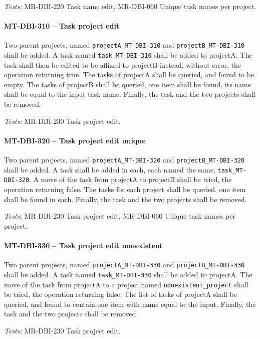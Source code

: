 \textit{Tests: } MR-DBI-220 Task name edit, MR-DBI-060 Unique task names per
project.

\paragraph{MT-DBI-310 -- Task project edit}
Two parent projects, named \lstinline{projectA_MT-DBI-310} and
\lstinline{projectB_MT-DBI-310} shall be added.
A task named \lstinline{task_MT-DBI-310} shall be added to projectA.
The task shall then be edited to be affixed to projectB instead,
without error, the operation returning true.
The tasks of projectA shall be queried, and found to be empty.
The tasks of projectB shall be queried, one item shall be found,
its name shall be equal to the input task name.
Finally, the task and the two projects shall be removed.

\textit{Tests: } MR-DBI-230 Task project edit.

\paragraph{MT-DBI-320 -- Task project edit unique}
Two parent projects, named \lstinline{projectA_MT-DBI-320} and
\lstinline{projectB_MT-DBI-320} shall be added.
A task shall be added in each, each named the same, \lstinline{task_MT-DBI-320}.
A move of the task from projectA to projectB shall be tried, the operation
returning false.
The tasks for each project shall be queried, one item shall be found in each.
Finally, the task and the two projects shall be removed.

\textit{Tests: } MR-DBI-230 Task project edit, MR-DBI-060 Unique task names
per project.

\paragraph{MT-DBI-330 -- Task project edit nonexistent}
Two parent projects, named \lstinline{projectA_MT-DBI-330} and
\lstinline{projectB_MT-DBI-330} shall be added.
A task named \lstinline{task_MT-DBI-330} shall be added to projectA.
The move of the task from projectA to a project named
\lstinline{nonexistent_project} shall be tried, the operation returning false.
The list of tasks of projectA shall be queried, and found to contain
one item with name equal to the input.
Finally, the task and the two projects shall be removed.

\textit{Tests: } MR-DBI-230 Task project edit.

